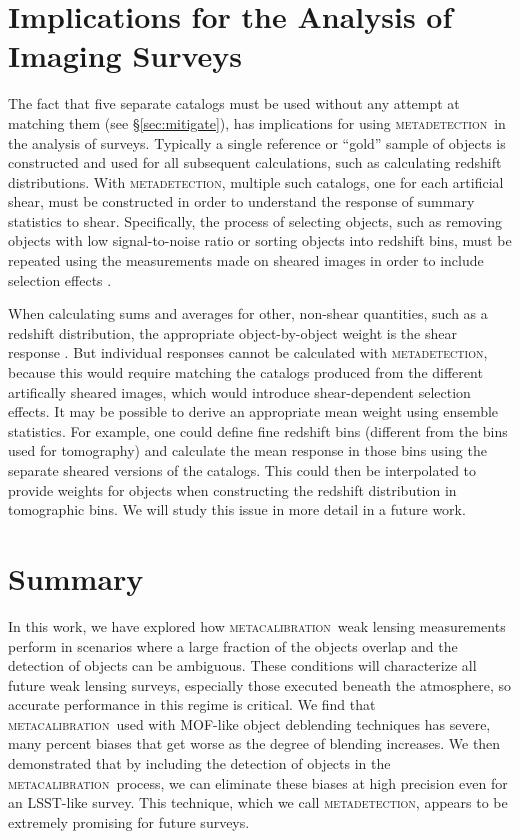 \documentclass[fleqn,useAMS,usenatbib]{mnras}
\newcommand{\mcal}{\textsc{metacalibration}}
\newcommand{\mdet}{\textsc{metadetection}}
\begin{document}
\section{Implications for the Analysis of Imaging Surveys} \label{sec:wavg}

The fact that five separate catalogs must be used without any attempt at
matching them (see \S \ref{sec:mitigate}), has implications for using \mdet\ in
the analysis of surveys.  Typically a single reference or ``gold'' sample of
objects is constructed and used for all subsequent calculations, such as
calculating redshift distributions.  With \mdet, multiple such catalogs, one
for each artificial shear, must be constructed in order to understand the
response of summary statistics to shear.  Specifically, the process of
selecting objects, such as removing objects with low signal-to-noise ratio or
sorting objects into redshift bins, must be repeated using the measurements made on
sheared images in order to include selection effects \citep{SheldonMcal2017}.

When calculating sums and averages for other, non-shear quantities, such as a
redshift distribution, the appropriate object-by-object weight is the shear
response \citep{SheldonMcal2017}.  But individual responses cannot be
calculated with \mdet, because this would require matching the catalogs
produced from the different artifically sheared images, which would introduce
shear-dependent selection effects.  It may be possible to derive an appropriate
mean weight using ensemble statistics.  For example, one could define fine
redshift bins (different from the bins used for tomography) and calculate the
mean response in those bins using the separate sheared versions of the
catalogs. This could then be interpolated to provide weights for objects when
constructing the redshift distribution in tomographic bins.  We will study this
issue in more detail in a future work.


\section{Summary}\label{sec:conc}

In this work, we have explored how \mcal\ weak lensing measurements perform in
scenarios where a large fraction of the objects overlap and the detection of
objects can be ambiguous. These conditions will characterize all future weak
lensing surveys, especially those executed beneath the atmosphere, so accurate
performance in this regime is critical. We find that \mcal\ used with MOF-like
object deblending techniques has severe, many percent biases that get worse as
the degree of blending increases. We then demonstrated that by including the
detection of objects in the \mcal\ process, we can eliminate these biases at
high precision even for an LSST-like survey. This technique, which we call
\mdet, appears to be extremely promising for future surveys.
\end{document}
